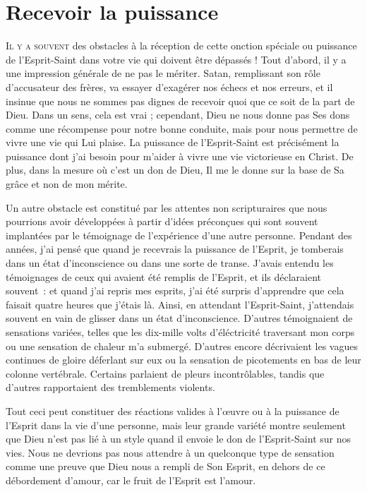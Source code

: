 \chapter{Recevoir la puissance}

\lettrine{I}{l y a souvent} des obstacles à la réception de cette onction
 spéciale ou puissance de l'Esprit-Saint dans votre vie qui doivent
 être dépassés ! Tout d'abord, il y a une impression générale
 de ne pas le mériter. Satan, remplissant son rôle d'accusateur
 des frères, va essayer d'exagérer nos échecs et nos erreurs,
 et il insinue que nous ne sommes pas dignes de recevoir quoi que ce soit
 de la part de Dieu. Dans un sens, cela est vrai ;
 cependant, Dieu ne nous donne pas Ses dons comme une récompense
 pour notre bonne conduite, mais pour nous permettre de vivre une vie
 qui Lui plaise. La puissance de l'Esprit-Saint est précisément
 la puissance dont j'ai besoin pour m'aider à vivre une vie victorieuse
 en Christ. De plus, dans la mesure où c'est un don de Dieu,
 Il me le donne sur la base de Sa grâce et non de mon mérite.

Un autre obstacle est constitué par les attentes non scripturaires
 que nous pourrions avoir développées à partir d'idées préconçues
 qui sont souvent implantées par le témoignage de l'expérience
 d'une autre personne. Pendant des années, j'ai pensé que
 quand je recevrais la puissance de l'Esprit, je tomberais dans un état
 d'inconscience ou dans une sorte de transe.
 J'avais entendu les témoignages de ceux qui avaient été remplis de l'Esprit,
 et ils déclaraient souvent~: \og [\dots{}] et quand j'ai repris mes esprits,
 j'ai été surpris d'apprendre que cela faisait quatre heures
 que j'étais là. \fg{}
 Ainsi, en attendant l'Esprit-Saint, j'attendais souvent en vain
 de glisser dans un état d'inconscience.
 D'autres témoignaient de sensations variées, telles que
 \og les dix-mille volts d'éléctricité traversant mon corps \fg{} ou
 \og une sensation de chaleur m'a submergé. \fg{}
 D'autres encore décrivaient les vagues continues de gloire déferlant
 sur eux ou la sensation de picotements en bas de leur colonne vertébrale.
 Certains parlaient de pleurs incontrôlables,
 tandis que d'autres rapportaient des tremblements violents.

Tout ceci peut constituer des réactions valides à l'œuvre
 ou à la puissance de l'Esprit dans la vie d'une personne,
 mais leur grande variété montre seulement que Dieu n'est pas lié
 à un style quand il envoie le don de l'Esprit-Saint sur nos vies.
 Nous ne devrions pas nous attendre à un quelconque type de sensation
 comme une preuve que Dieu nous a rempli de Son Esprit,
 en dehors de ce débordement d'amour, car le fruit de l'Esprit est l'amour.

